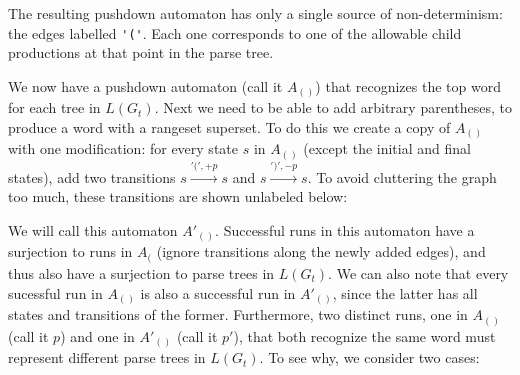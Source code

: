 \documentclass[sigplan]{acmart}\settopmatter{printfolios=true,printccs=false,printacmref=false}
\begin{document}
\noindent The resulting pushdown automaton has only a single source of non-determinism: the edges labelled \verb|'('|. Each one corresponds to one of the allowable child productions at that point in the parse tree.

We now have a pushdown automaton (call it $A_{()}$) that recognizes the top word for each tree in $L(G_t)$. Next we need to be able to add arbitrary parentheses, to produce a word with a rangeset superset. To do this we create a copy of $A_{()}$ with one modification: for every state $s$ in $A_{()}$ (except the initial and final states), add two transitions $s \xrightarrow{'(', +p} s$ and $s \xrightarrow{')', -p} s$. To avoid cluttering the graph too much, these transitions are shown unlabeled below:

\begin{center}
\end{center}

\noindent We will call this automaton $A'_{()}$. Successful runs in this automaton have a surjection to runs in $A_($ (ignore transitions along the newly added edges), and thus also have a surjection to parse trees in $L(G_t)$. We can also note that every sucessful run in $A_{()}$ is also a successful run in $A'_{()}$, since the latter has all states and transitions of the former. Furthermore, two distinct runs, one in $A_{()}$ (call it $p$) and one in $A'_{()}$ (call it $p'$), that both recognize the same word must represent different parse trees in $L(G_t)$. To see why, we consider two cases:
\end{document}

